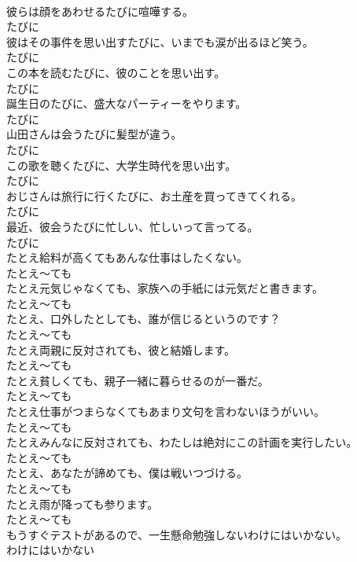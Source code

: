 \documentclass[8pt]{extreport}
\begin{document}
\begin{CJK}{UTF8}{min}
\\	彼らは顔をあわせるたびに喧嘩する。	
\\	たびに
\\	彼はその事件を思い出すたびに、いまでも涙が出るほど笑う。	
\\	たびに
\\	この本を読むたびに、彼のことを思い出す。	
\\	たびに
\\	誕生日のたびに、盛大なパーティーをやります。	
\\	たびに
\\	山田さんは会うたびに髪型が違う。	
\\	たびに
\\	この歌を聴くたびに、大学生時代を思い出す。	
\\	たびに
\\	おじさんは旅行に行くたびに、お土産を買ってきてくれる。	
\\	たびに
\\	最近、彼会うたびに忙しい、忙しいって言ってる。	
\\	たびに
\\	たとえ給料が高くてもあんな仕事はしたくない。	
\\	たとえ～ても
\\	たとえ元気じゃなくても、家族への手紙には元気だと書きます。	
\\	たとえ～ても
\\	たとえ、口外したとしても、誰が信じるというのです？	
\\	たとえ～ても
\\	たとえ両親に反対されても、彼と結婚します。	
\\	たとえ～ても
\\	たとえ貧しくても、親子一緒に暮らせるのが一番だ。	
\\	たとえ～ても
\\	たとえ仕事がつまらなくてもあまり文句を言わないほうがいい。	
\\	たとえ～ても
\\	たとえみんなに反対されても、わたしは絶対にこの計画を実行したい。	
\\	たとえ～ても
\\	たとえ、あなたが諦めても、僕は戦いつづける。	
\\	たとえ～ても
\\	たとえ雨が降っても参ります。	
\\	たとえ～ても
\\	もうすぐテストがあるので、一生懸命勉強しないわけにはいかない。	
\\	わけにはいかない

\end{CJK}
\end{document}
